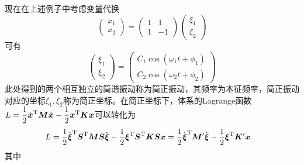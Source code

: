 现在在上述例子中考虑变量代换
\begin{equation*}
	\begin{pmatrix} x_1 \\ x_2 \end{pmatrix} = \begin{pmatrix} 1 & 1 \\ 1 & -1 \end{pmatrix} \begin{pmatrix} \xi_1 \\ \xi_2 \end{pmatrix}
\end{equation*}
可有
\begin{equation*}
	\begin{pmatrix} \xi_1 \\ \xi_2 \end{pmatrix} = \begin{pmatrix} C_1 \cos (\omega_1 t + \phi_1) \\ C_2 \cos (\omega_2 t + \phi_2) \end{pmatrix}
\end{equation*}
此处得到的两个相互独立的简谐振动称为{\heiti 简正振动}，其频率为{\heiti 本征频率}，简正振动对应的坐标$\xi_1,\xi_2$称为{\heiti 简正坐标}。在简正坐标下，体系的Lagrange函数$L = \dfrac12 \dot{\boldsymbol{x}}^{\mathrm{T}} \boldsymbol{M} \dot{\boldsymbol{x}} - \dfrac12 \boldsymbol{x}^{\mathrm{T}} \boldsymbol{K} \boldsymbol{x}$可以转化为
\begin{align*}
	L & = \frac12 \dot{\boldsymbol{\xi}}^{\mathrm{T}} \boldsymbol{S}^{\mathrm{T}} \boldsymbol{M} \boldsymbol{S} \dot{\boldsymbol{\xi}} - \frac12 \boldsymbol{\xi}^{\mathrm{T}} \boldsymbol{S}^{\mathrm{T}} \boldsymbol{K} \boldsymbol{S} \boldsymbol{x} = \frac12 \dot{\boldsymbol{\xi}}^{\mathrm{T}} \boldsymbol{M}' \dot{\boldsymbol{\xi}} - \frac12 \boldsymbol{\xi}^{\mathrm{T}} \boldsymbol{K}' \boldsymbol{x}
\end{align*}
其中

